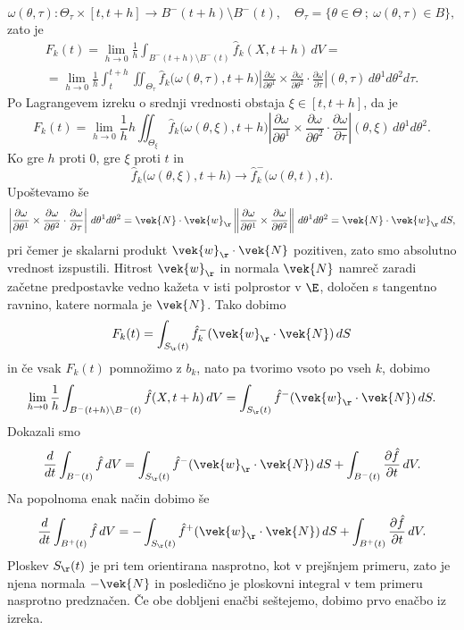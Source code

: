 	\[
		\omega(\theta,\tau)\colon\Theta_{\tau}\times [t,t+h]\to B^-(t+h)\setminus B^-(t),\quad
		\Theta_{\tau}=\{\theta\in \Theta\: ;\: \omega(\theta,\tau)\in B\},
	\]
	zato je
	\begin{multline*}
		F_k(t)=\lim_{h\to 0} \frac{1}{h}\int_{B^-(t+h)\setminus B^-(t)} \hat{f}_k(X,t+h)\,dV=\\
		=\lim_{h\to 0} \frac{1}{h}\int_{t}^{t+h}\iint_{\Theta_{\tau}}\hat{f}_k\big(\omega(\theta,\tau),t+h\big)
		\left|\frac{\partial\omega}{\partial\theta^1}\times\frac{\partial\omega}{\partial\theta^2}\cdot\frac{\partial\omega}{\partial\tau}\right|
		(\theta,\tau)\,d\theta^1 d\theta^2 d\tau.
	\end{multline*}
	Po Lagrangevem izreku o srednji vrednosti obstaja $\xi\in [t,t+h]$, da je
	\[
		F_k(t)=\lim_{h\to 0} \frac{1}{h}h\iint_{\Theta_{\xi}}\hat{f}_k\big(\omega(\theta,\xi),t+h\big)
		\left|\frac{\partial\omega}{\partial\theta^1}\times\frac{\partial\omega}{\partial\theta^2}\cdot\frac{\partial\omega}{\partial\tau}\right|
		(\theta,\xi)\,d\theta^1 d\theta^2.
	\]
	Ko gre $h$ proti $0$, gre $\xi$ proti $t$ in
	\[ \hat{f}_k\big(\omega(\theta,\xi),t+h\big)\to\hat{f}^-_k\big(\omega(\theta,t),t\big). \]
	Upoštevamo še
	\[
		\left|\frac{\partial\omega}{\partial\theta^1}\times\frac{\partial\omega}{\partial\theta^2}\cdot
		\frac{\partial\omega}{\partial\tau}\right|\,d\theta^1 d\theta^2=
		\vek{N}\cdot\vek{w}_{\r}
		\left\|\frac{\partial\omega}{\partial\theta^1}\times\frac{\partial\omega}{\partial\theta^2}\right\|\,d\theta^1 d\theta^2=
		\vek{N}\cdot\vek{w}_{\r}\,dS,
	\]
	pri čemer je skalarni produkt $\vek{w}_{\r}\cdot\vek{N}$ pozitiven, zato smo absolutno vrednost izspustili.
	Hitrost $\vek{w}_{\r}$ in normala $\vek{N}$ namreč zaradi začetne predpostavke vedno kažeta v isti polprostor v $\E$,
	določen s tangentno ravnino, katere normala je $\vek{N}$. Tako dobimo
	\[ F_k(t)=\int_{S_{\r}(t)}\hat{f}_k^-(\vek{w}_{\r}\cdot\vek{N})\,dS \]
	in če vsak $F_k(t)$ pomnožimo z $b_k$, nato pa tvorimo vsoto po vseh $k$, dobimo
	\[
		\lim_{h\to 0} \frac{1}{h}\int_{B^-(t+h)\setminus B^-(t)} \hat{f}(X,t+h)\,dV =
		\int_{S_{\r}(t)}\hat{f}^-(\vek{w}_{\r}\cdot\vek{N})\,dS.
	\]
	Dokazali smo
	\begin{equation} \label{e:vmrez}
		\frac{d}{dt}\int_{B^-(t)} \hat{f}\,dV =
		\int_{S_{\r}(t)}\hat{f}^-(\vek{w}_{\r}\cdot\vek{N})\,dS +
		\int_{B^-(t)} \frac{\partial\hat{f}}{\partial t}\,dV.
	\end{equation}
	Na popolnoma enak način dobimo še
	\begin{equation*}
		\frac{d}{dt}\int_{B^+(t)} \hat{f}\,dV =
		-\int_{S_{\r}(t)}\hat{f}^+(\vek{w}_{\r}\cdot\vek{N})\,dS +
		\int_{B^+(t)} \frac{\partial\hat{f}}{\partial t}\,dV.
	\end{equation*}
	Ploskev $S_{\r}(t)$ je pri tem orientirana nasprotno, kot v prejšnjem primeru,
	zato je njena normala $-\vek{N}$ in posledično je ploskovni integral v tem primeru
	nasprotno predznačen. Če obe dobljeni enačbi seštejemo, dobimo prvo enačbo
	iz izreka.
	
